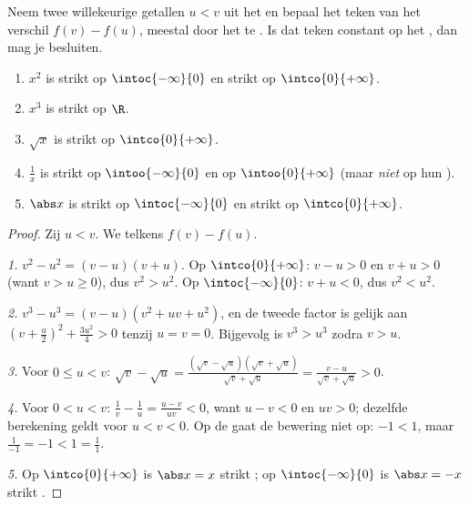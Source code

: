 \begin{method}\label{met:g11:func:variation}
Neem twee willekeurige getallen $u < v$ uit het  en bepaal het teken
van het verschil $f(v) - f(u)$, meestal door het te \emph{}. Is dat
teken constant op het , dan mag je besluiten.
\end{method}

\begin{proposition}\label{prop:g11:func:refvariations}
\begin{enumerate}
  \item $x^2$ is strikt  op $\intoc{-\infty}{0}$ en strikt  op
        $\intco{0}{+\infty}$.
  \item $x^3$ is strikt  op $\R$.
  \item $\sqrt x$ is strikt  op $\intco{0}{+\infty}$.
  \item $\frac1x$ is strikt  op $\intoo{-\infty}{0}$ en op
        $\intoo{0}{+\infty}$ (maar \emph{niet} op hun ).
  \item $\abs x$ is strikt  op $\intoc{-\infty}{0}$ en strikt 
        op $\intco{0}{+\infty}$.
\end{enumerate}
\end{proposition}

\begin{proof}
Zij $u < v$. We  telkens $f(v) - f(u)$.

\emph{1.} $v^2 - u^2 = (v-u)(v+u)$. Op $\intco{0}{+\infty}$: $v - u > 0$ en
$v + u > 0$ (want $v > u \geq 0$), dus $v^2 > u^2$. Op
$\intoc{-\infty}{0}$: $v + u < 0$, dus $v^2 < u^2$.

\emph{2.} $v^3 - u^3 = (v - u)(v^2 + uv + u^2)$, en de tweede factor is
gelijk aan $\left(v + \frac u2\right)^2 + \frac{3u^2}{4} > 0$ tenzij
$u = v = 0$. Bijgevolg is $v^3 > u^3$ zodra $v > u$.

\emph{3.} Voor $0 \leq u < v$:
$\sqrt v - \sqrt u = \frac{(\sqrt v - \sqrt u)(\sqrt v + \sqrt u)}
{\sqrt v + \sqrt u} = \frac{v - u}{\sqrt v + \sqrt u} > 0$.

\emph{4.} Voor $0 < u < v$: $\frac1v - \frac1u = \frac{u - v}{uv} < 0$,
want $u - v < 0$ en $uv > 0$; dezelfde berekening geldt voor $u < v < 0$. Op
de  gaat de bewering niet op: $-1 < 1$, maar
$\frac{1}{-1} = -1 < 1 = \frac11$.

\emph{5.} Op $\intco{0}{+\infty}$ is $\abs x = x$ strikt ; op
$\intoc{-\infty}{0}$ is $\abs x = -x$ strikt .
\end{proof}

